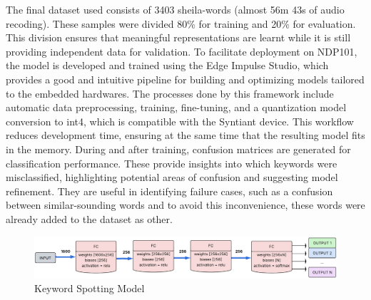 The final dataset used consists of 3403 sheila-words (almost 56m 43s of audio recoding). These samples were divided 80\% for training and 20\% for evaluation. This division ensures that meaningful representations are learnt while it is still providing independent data for validation.
To facilitate deployment on NDP101, the model is developed and trained using the Edge Impulse Studio\cite{edgeimpulse_kws_example}, which provides a good and intuitive pipeline for building and optimizing models tailored to the embedded hardwares. The processes done by this framework include automatic data preprocessing, training, fine-tuning, and a quantization model conversion to int4, which is compatible with the Syntiant device. This workflow reduces development time, ensuring at the same time that the resulting model fits in the memory.
During and after training, confusion matrices are generated for classification performance. These provide insights into which keywords were misclassified, highlighting potential areas of confusion and suggesting model refinement. They are useful in identifying failure cases, such as a confusion between similar-sounding words and to avoid this inconvenience, these words were already added to the dataset as other.
\begin{center}
  \begin{figure}[!h]
  \centering
  \includegraphics[width=1.0\textwidth]{images/3.01 KWS Model.png}
  \caption{Keyword Spotting Model}
\end{figure}
\end{center}
